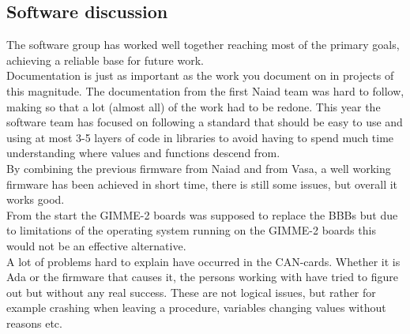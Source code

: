 \subsection{Software discussion}
\noindent
The software group has worked well together reaching most of the primary goals, achieving a reliable base for future work.
\\
Documentation is just as important as the work you document on in projects of this magnitude. The documentation from the first Naiad team was hard to follow, making so that a lot (almost all) of the work had to be redone.
This year the software team has focused on following a standard that should be easy to use and using at most 3-5 layers of code in libraries to avoid having to spend much time understanding where values and functions descend from.\\
By combining the previous firmware from Naiad and from Vasa, a well working firmware has been achieved in short time, there is still some issues, but overall it works good.
\\
From the start the GIMME-2 boards was supposed to replace the BBBs but due to limitations of the operating system running on the GIMME-2 boards this would not be an effective alternative.
\\
A lot of problems hard to explain have occurred in the CAN-cards. Whether it is Ada or the firmware that causes it, the persons working with have tried to figure out but without any real success. These are not logical issues, but rather for example crashing when leaving a procedure, variables changing values without reasons etc.